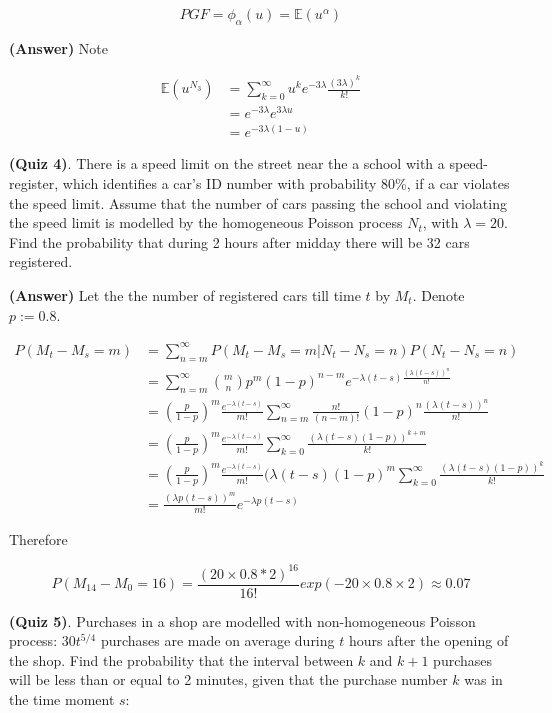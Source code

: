 \documentclass[12pt]{article}
\theoremstyle{nonumberbreak}
\begin{document}
$$
PGF = \phi_\alpha (u) = \mathbb{E}(u^\alpha)
$$

\textbf{(Answer)} Note

$$
\begin{aligned}
\mathbb{E}(u^{N_3}) &= \sum_{k=0}^\infty u^k e^{-3\lambda} \frac{(3\lambda)^k}{k!} \\[8pt]
&= e^{-3\lambda} e^{3\lambda u} \\[8pt]
&= e^{-3\lambda(1-u)}
\end{aligned}
$$



\textbf{(Quiz 4)}. There is a speed limit on the street near the a school with a speed-register, which identifies a car's ID number with probability 80\%, if a car violates the speed limit. Assume that the number of cars passing the school and violating the speed limit is modelled by the homogeneous Poisson process $N_t$, with $\lambda=20$. Find the probability that during 2 hours after midday there will be 32 cars registered.


\textbf{(Answer)} Let the the number of registered cars till time $t$ by $M_t$. Denote $p := 0.8$. 

$$
\begin{aligned}
P(M_t - M_s = m) &= \sum_{n=m}^\infty P(M_t - M_s = m | N_t - N_s = n ) P (N_t - N_s = n)\\[8pt]
&= \sum_{n=m}^\infty \binom{m}{n} p^m (1-p)^{n-m} e^{-\lambda(t-s) \frac{(\lambda(t-s))^n}{n!}} \\[8pt]
&= (\frac{p}{1-p})^m \frac{e^{-\lambda (t-s)}}{m!}\sum_{n=m}^\infty \frac{n!}{(n-m)!} (1-p)^n \frac{(\lambda(t-s))^n}{n!} \\[8pt]
&= (\frac{p}{1-p})^m \frac{e^{-\lambda (t-s)}}{m!} \sum_{k=0}^\infty \frac{(\lambda (t-s) (1-p) )^{k+m}}{k!} \\[8pt]
&= (\frac{p}{1-p})^m \frac{e^{-\lambda (t-s)}}{m!} (\lambda (t-s) (1-p)^m \sum_{k=0}^\infty \frac{(\lambda (t-s) (1-p) )^k}{k!} \\[8pt]
&= \frac{(\lambda p (t-s))^m}{m!} e^{-\lambda p (t-s)}
\end{aligned}
$$

Therefore

$$
P (M_{14} - M_0 = 16) = \frac{(20\times 0.8 * 2)^{16}}{16!} exp(-20\times0.8\times2) \approx 0.07
$$



\textbf{(Quiz 5)}. Purchases in a shop are modelled with non-homogeneous Poisson process: $30t^{5/4}$ purchases are made on average during $t$ hours after the opening of the shop. Find the probability that the interval between $k$ and $k+1$ purchases will be less than or equal to 2 minutes, given that the purchase number $k$ was in the time moment $s$:
\end{document}
